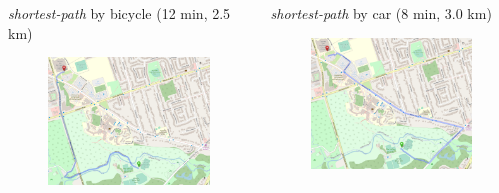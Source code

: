 \documentclass[aspectratio=169]{beamer}
\begin{document}
\begin{frame}

	
	\begin{columns}
		\begin{column}{0.5\textwidth}
			\small \textit{shortest-path} by bicycle (12 min, 2.5 km)
			\begin{figure}
				\centering
				\includegraphics[width=1\linewidth]{images/route_utsc_bike}
			\end{figure}
		\end{column}
		\begin{column}{0.5\textwidth}
			
			\small \textit{shortest-path} by car (8 min, 3.0 km)
			\begin{figure}
				\centering
				\includegraphics[width=1\linewidth]{images/route_utsc_car}
			\end{figure}
		\end{column}
	\end{columns}


\end{frame}
\end{document}
